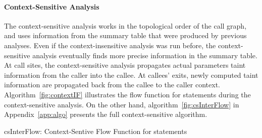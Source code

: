 \paragraph{Context-Sensitive Analysis}
The context-sensitive analysis works in the topological order
of the call graph, and uses information from the summary table
that were produced by previous analyses. Even if the context-insensitive
analysis was run before, the context-sensitive analysis eventually
finds more precise information in the summary table. At call sites,
the context-sensitive analysis propagates actual parameters
taint information from the caller into the callee. At callees' exits,
newly computed taint information are propagated back from the
callee to the caller context. Algorithm~\ref{fig:contextIF}
illustrates the flow function for \callt statements during the
context-sensitive analysis. On the other hand, algorithm~\ref{fig:csInterFlow}
in Appendix~\ref{app:algo} presents the full context-sensitive
algorithm.
\begin{algorithm}
\caption{csInterFlow: Context-Sentive Flow Function for \callt
statements}\label{fig:contextIF}
\SetAlgoLined
\LinesNumbered
\DontPrintSemicolon
{}

\OutData{}
\end{algorithm}

